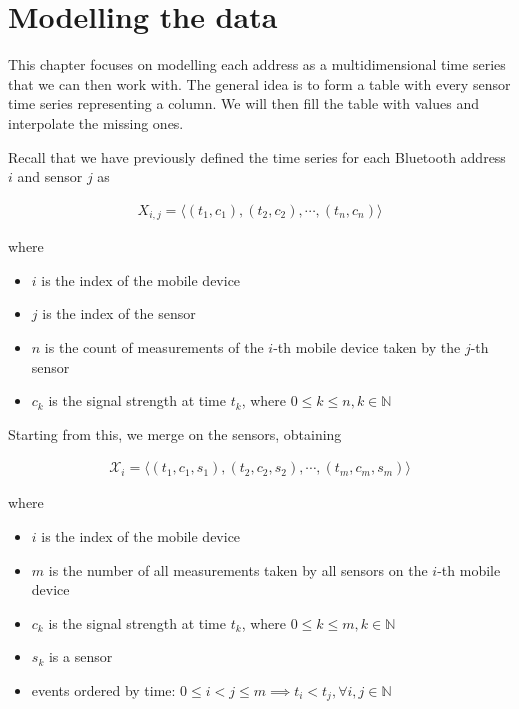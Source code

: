 \chapter{Modelling the data}\label{chap:datamodelling}

This chapter focuses on modelling each address as a multidimensional time series that we can then work with. The general idea is to form a table with every sensor time series representing a column. We will then fill the table with values and interpolate the missing ones.

Recall that we have previously defined the time series for each Bluetooth address $i$ and sensor $j$ as

\begin{align*}
	X_{i,j} = \langle (t_1, c_1), (t_2, c_2), \cdots, (t_n, c_n)\rangle
\end{align*}

where

\begin{itemize}
	\item $i$ is the index of the mobile device
	\item $j$ is the index of the sensor
	\item $n$ is the count of measurements of the $i$-th mobile device taken by the $j$-th sensor
	\item $c_k$ is the signal strength at time $t_k$, where $0 \leq k \leq n, k \in \mathbb{N}$
\end{itemize}

Starting from this, we merge on the sensors, obtaining

\begin{align*}
	\mathcal{X}_i = \langle (t_1, c_1, s_1), (t_2, c_2, s_2), \cdots, (t_m, c_m, s_m)\rangle
\end{align*}

where  

\begin{itemize}
	\item $i$ is the index of the mobile device
	\item $m$ is the number of all measurements taken by all sensors on the $i$-th mobile device
	\item $c_k$ is the signal strength at time $t_k$, where $0 \leq k \leq m, k \in \mathbb{N}$
	\item $s_k$ is a sensor
	\item events ordered by time: $0 \leq i < j \leq m \implies t_i < t_j, \forall i, j \in \mathbb{N}$
\end{itemize}

